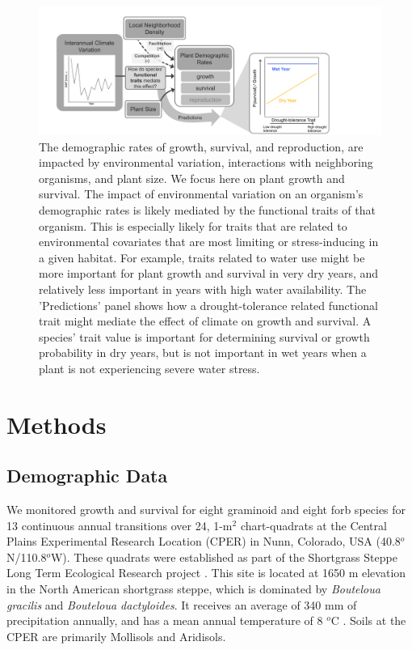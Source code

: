 \documentclass[12pt, letterpaper]{article}
\begin{document}
\begin{figure}
\includegraphics[width=1\textwidth]{images_old/CO_sgs_ConceptualFigure.pdf}
\caption{\small{
The demographic rates of growth, survival, and reproduction, are impacted by environmental variation, interactions with neighboring organisms, and plant size. We focus here on plant growth and survival. The impact of environmental variation on an organism's demographic rates is likely mediated by the functional traits of that organism. This is especially likely for traits that are related to environmental covariates that are most limiting or stress-inducing in a given habitat. For example, traits related to water use might be more important for plant growth and survival in very dry years, and relatively less important in years with high water availability. The 'Predictions' panel shows how a drought-tolerance related functional trait might mediate the effect of climate on growth and survival. A species' trait value is important for determining survival or growth probability in dry years, but is not important in wet years when a plant is not experiencing severe water stress. 
}}
\label{fig:ConceptFig}
\end{figure}

\section{Methods}
\subsection{Demographic Data} 
We monitored growth and survival for eight graminoid and eight forb species for 13 continuous annual transitions over 24, 1-m$^2$ chart-quadrats at the Central Plains Experimental Research Location (CPER) in Nunn, Colorado, USA (40.8$^o$N/110.8$^o$W). These quadrats were established as part of the Shortgrass Steppe Long Term Ecological Research project \citep{Chu2013}. This site is located at 1650 m elevation in the North American shortgrass steppe, which is dominated by \textit{Bouteloua gracilis} and \textit{Bouteloua dactyloides}. It receives an average of 340 mm of precipitation annually, and has a mean annual temperature of 8 $^o$C \citep{Chu2014}. Soils at the CPER are primarily Mollisols and Aridisols.
\end{document}
